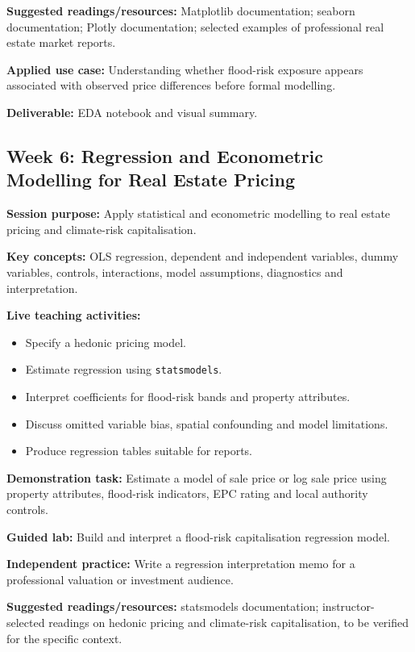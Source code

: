 \documentclass[
  a4paper,
]{article}
\providecommand{\tightlist}{%
  \setlength{\itemsep}{0pt}\setlength{\parskip}{0pt}}
\begin{document}
\textbf{Suggested readings/resources:} Matplotlib documentation; seaborn
documentation; Plotly documentation; selected examples of professional
real estate market reports.

\textbf{Applied use case:} Understanding whether flood-risk exposure
appears associated with observed price differences before formal
modelling.

\textbf{Deliverable:} EDA notebook and visual summary.

\subsection{Week 6: Regression and Econometric Modelling for Real Estate
Pricing}\label{week-6-regression-and-econometric-modelling-for-real-estate-pricing}

\textbf{Session purpose:} Apply statistical and econometric modelling to
real estate pricing and climate-risk capitalisation.

\textbf{Key concepts:} OLS regression, dependent and independent
variables, dummy variables, controls, interactions, model assumptions,
diagnostics and interpretation.

\textbf{Live teaching activities:}

\begin{itemize}
\tightlist
\item
  Specify a hedonic pricing model.
\item
  Estimate regression using \texttt{statsmodels}.
\item
  Interpret coefficients for flood-risk bands and property attributes.
\item
  Discuss omitted variable bias, spatial confounding and model
  limitations.
\item
  Produce regression tables suitable for reports.
\end{itemize}

\textbf{Demonstration task:} Estimate a model of sale price or log sale
price using property attributes, flood-risk indicators, EPC rating and
local authority controls.

\textbf{Guided lab:} Build and interpret a flood-risk capitalisation
regression model.

\textbf{Independent practice:} Write a regression interpretation memo
for a professional valuation or investment audience.

\textbf{Suggested readings/resources:} statsmodels documentation;
instructor-selected readings on hedonic pricing and climate-risk
capitalisation, to be verified for the specific context.
\end{document}
